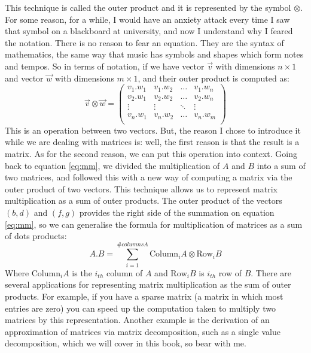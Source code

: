 \documentclass[600paper, 11pt,twoside,openany]{kdp}
\begin{document}
This technique is called the outer product and it is represented by the symbol $\otimes$. For some reason, for a while, I would have an anxiety attack every time I saw that symbol on a blackboard at university, and now I understand why I feared the notation. There is no reason to fear an equation. They are the syntax of mathematics, the same way that music has symbols and shapes which form notes and tempos. So in terms of notation, if we have vector $\overrightarrow{v}$ with dimensions $n \times 1$ and vector $\overrightarrow{w}$ with dimensions $m \times 1$, and their outer product is computed as:
\[
\overrightarrow{v} \otimes \overrightarrow{w} = 
\begin{pmatrix}
v_1.w_1 & v_1.w_2 & \hdots & v_1.w_n \\
v_2.w_1 & v_2.w_2 & \hdots & v_2.w_n \\
\vdots & \vdots & \ddots & \vdots \\
v_n.w_1 & v_n.w_2 & \hdots & v_n.w_m\\
\end{pmatrix}
\]
\indent This is an operation between two vectors. But, the reason I chose to introduce it while we are dealing with matrices is: well, the first reason is that the result is a matrix. As for the second reason, we can put this operation into context. Going back to equation \ref{eq:mm}, we divided the multiplication of $A$ and $B$ into a sum of two matrices, and followed this with a new way of computing a matrix via the outer product of two vectors. This technique allows us to represent matrix multiplication as a sum of outer products. The outer product of the vectors $(b,d)$ and $(f,g)$ provides the right
\newpage
side of the summation on equation \ref{eq:mm}, so we can generalise the formula for multiplication of matrices as a sum of dots products:
\[ A.B = \sum_{i=1}^{\#columnsA} \textrm{Column}_i A \otimes \textrm{Row}_i B \]
\indent Where $\textrm{Column}_i A$ is the $i_{th}$ column of $A$ and $\textrm{Row}_i B$ is $i_{th}$ row of $B$. There are several applications for representing matrix multiplication as the sum of outer products. For example, if you have a sparse matrix (a matrix in which most entries are zero) you can speed up the computation taken to multiply two matrices by this representation. Another example is the derivation of an approximation of matrices via matrix decomposition, such as a single value decomposition, which we will cover in this book, so bear with me.
\end{document}
